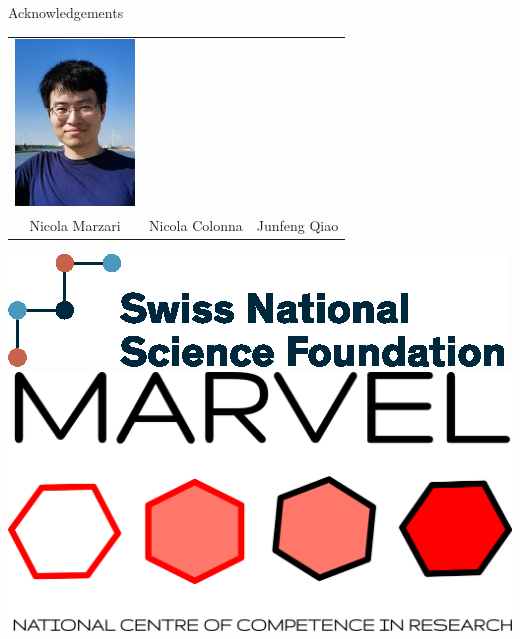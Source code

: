 \documentclass[xcolor=table,aspectratio=169]{beamer}
\numberwithin{equation}{section}
\begin{document}
\begin{frame}{Acknowledgements}
\begin{center}
\begin{tabularx}{0.7\textwidth}{CCC}
         \includegraphics[height = 0.3\paperheight]{photos/junfeng.jpeg} \\
         Nicola Marzari                                                          &
         Nicola Colonna                                                          &
         Junfeng Qiao
      \end{tabularx}
   \end{center}

   \vspace{2ex}

   \begin{center}
      \includegraphics[height = 0.15\paperheight]{logos/SNF_logo_standard_print_color_pos_e.eps}
      \hspace{3em}
      \includegraphics[height = 0.15\paperheight]{figures/marvel_trimmed.png}
   \end{center}


\end{frame}
\end{document}
